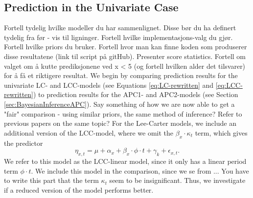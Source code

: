 \subsection{Prediction in the Univariate Case}
\textcolor{myDarkGreen}{
Fortell tydelig hvilke modeller du har sammenlignet. Disse bør du ha definert tydelig fra før - vis til ligninger. Fortell hvilke implementasjons-valg du gjør. Fortell hvilke priors du bruker. Fortell hvor man kan finne koden som produserer disse resultatene (link til script på gitHub). 
\newline \newline
Presenter score statistics. Fortell om valget om å kutte prediksjonene ved x < 5 (og fortell hvilken alder det tilsvarer) for å få et riktigere resultat.
\newline \newline
}
We begin by comparing prediction results for the univariate LC- and LCC-models (see Equations \ref{eq:LC-rewritten} and \ref{eq:LCC-rewritten}) to prediction results for the APC1- and APC2-models (see Section \ref{sec:BayesianInferenceAPC}).
\textcolor{myDarkGreen}{Say something of how we are now able to get a "fair" comparison - using similar priors, the same method of inference? Refer to previous papers on the same topic? }
For the Lee-Carter models, we include an additional version of the LCC-model, where we omit the $\beta_x\cdot \kappa_t$ term, which gives the predictor
\begin{equation}
    \eta_{x,t} = \mu + \alpha_x + \beta_x\cdot \phi \cdot t + \gamma_k + \epsilon_{x,t}.
\end{equation}
We refer to this model as the LCC-linear model, since it only has a linear period term $\phi \cdot t$. We include this model in the comparison, since we se from ... \textcolor{myDarkGreen}{You have to write this part} that the term $\kappa_t$ seem to be insignificant. Thus, we investigate if a reduced version of the model performs better. 

